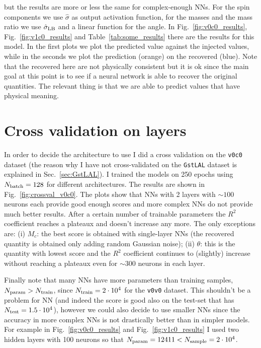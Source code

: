 \documentclass[prd,aps,twocolumn,a4paper,showkeys,nofootinbib]{article}
\begin{document}
but the results are more or less the same for complex-enough NNs.
For the spin components we use $\hat{\sigma}$ as output 
activation function, for the masses and the mass ratio we use $\hat{\sigma}_{\rm LB}$ and
a linear function for the angle. 
In Fig.~\ref{fig:v0c0_results}, Fig.~\ref{fig:v1c0_results} and Table~\ref{tab:some_results}
there are the results for this model.
In the first plots we plot the predicted value against the injected values, while in the seconds
we plot the prediction (orange) on the recovered (blue). Note that the recovered here are not 
physically consistent but it is ok since the main goal at this point 
is to see if a neural network is able to 
recover the original quantities. The relevant thing is that we are able to predict values
that have physical meaning.

\section{Cross validation on layers}
\label{sec:crossval}
In order to decide the architecture to use I did a cross validation on the 
\texttt{v0c0} dataset (the reason why I have not cross-validated on the \texttt{GstLAL} dataset
is explained in Sec.~\ref{sec:GstLAL}). I trained the models on 250 epochs using
$N_{\rm batch}=128$ for different architectures. The results are shown 
in Fig.~\ref{fig:crossval_v0c0}. The plots show that NNs with 2 layers with $\sim 100$ 
neurons each provide good enough scores and more complex NNs do not provide much better results. 
After a certain number of trainable parameters the $R^2$ coefficient reaches a plateaux 
and doesn't increase any more. 
The only exceptions are: (i) $M_c$: the best score is obtained with single-layer NNs 
(the recovered quantity is obtained only adding random Gaussian noise); 
(ii) $\theta$: this is the quantity with lowest score and the $R^2$ coefficient 
continues to (slightly) increase without reaching a plateaux even for $\sim 300$
neurons in each layer. 

Finally note that many NNs have more parameters than training samples, 
$N_{\rm param}>N_{\rm train}$, since 
$N_{\rm train}=2\cdot 10^4$ for the \texttt{v0v0} dataset. This shouldn't be a problem 
for NN (and indeed the score is good also on the test-set that has 
$N_{\rm test}=1.5\cdot 10^4$), however we could also decide to use smaller NNs 
since the accuracy in more complex NNs is not drastically better than in simpler models. 
For example in Fig.~\ref{fig:v0c0_results} and Fig.~\ref{fig:v1c0_results} I used
two hidden layers with 100 neurons so that $N_{\rm param}=12411<N_{\rm sample}=2\cdot 10^4$.
\end{document}
